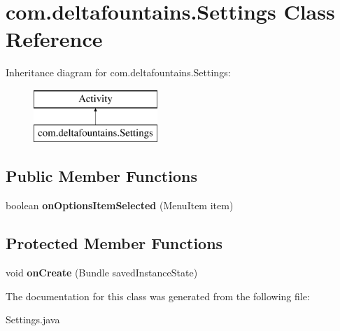 \hypertarget{classcom_1_1deltafountains_1_1Settings}{\section{com.\-deltafountains.\-Settings Class Reference}
\label{classcom_1_1deltafountains_1_1Settings}
}
Inheritance diagram for com.\-deltafountains.\-Settings\-:\begin{figure}[H]
\begin{center}
\leavevmode
\includegraphics[height=2.000000cm]{classcom_1_1deltafountains_1_1Settings}
\end{center}
\end{figure}
\subsection*{Public Member Functions}
\begin{DoxyCompactItemize}
\item 
\hypertarget{classcom_1_1deltafountains_1_1Settings_a98bf9b724b8e96b61e0f9488ec041222}{boolean {\bfseries on\-Options\-Item\-Selected} (Menu\-Item item)}\label{classcom_1_1deltafountains_1_1Settings_a98bf9b724b8e96b61e0f9488ec041222}

\end{DoxyCompactItemize}
\subsection*{Protected Member Functions}
\begin{DoxyCompactItemize}
\item 
\hypertarget{classcom_1_1deltafountains_1_1Settings_a47b242e34f20a763ad926be34e0531bc}{void {\bfseries on\-Create} (Bundle saved\-Instance\-State)}\label{classcom_1_1deltafountains_1_1Settings_a47b242e34f20a763ad926be34e0531bc}

\end{DoxyCompactItemize}


The documentation for this class was generated from the following file\-:\begin{DoxyCompactItemize}
\item 
Settings.\-java\end{DoxyCompactItemize}
